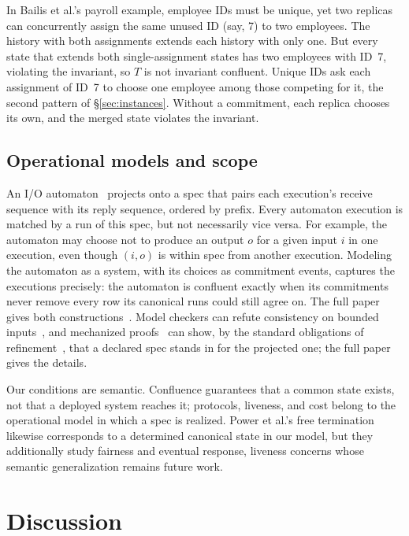 \documentclass[sigconf]{cidr-2027}
\theoremstyle{remark}
\newcommand{\commitment}{commitment\xspace}
\newcommand{\commitments}{commitments\xspace}
\newcommand{\inrel}{extends\xspace}          %
\newcommand{\outrel}{extends\xspace}          %
\newcommand{\extended}{the full paper~\cite{hellerstein2026completecalmfull}}
\begin{document}
In Bailis et al.'s payroll example, employee IDs must be unique, yet two
replicas can concurrently assign the same unused ID (say, 7) to two employees.
The history with both assignments \inrel each history with only one.  But every state that \outrel both single-assignment
states has two employees with ID~7, violating the invariant, so $T$ is not
invariant confluent.  Unique IDs ask each assignment of ID~7 to choose one
employee among those competing for it, the second pattern of
\S\ref{sec:instances}.  Without a \commitment, each replica chooses its own,
and the merged state violates the invariant.

\subsection{Operational models and scope}
\label{sec:scope}

An I/O automaton~\cite{lynch1987io} projects onto a spec that pairs each
execution's receive sequence with its reply sequence, ordered by prefix.
Every automaton execution is matched by a run of this spec, but not
necessarily vice versa.  For example, the automaton may choose not to produce
an output $o$ for a given input $i$ in one execution, even though $(i,o)$ is
within spec from another execution.  Modeling the automaton as a system, with
its choices as \commitment events, captures the executions precisely: the
automaton is confluent exactly when its \commitments never remove every row
its canonical runs could still agree on.  The full paper gives both
constructions~\cite{hellerstein2026completecalmfull}.
Model checkers can refute
consistency on bounded inputs~\cite{newcombe2015aws}, and mechanized
proofs~\cite{hawblitzel2015ironfleet} can show, by the standard obligations of
refinement~\cite{abadi1991refinement}, that a declared spec stands in for the
projected one; \extended{} gives the details.

  Our conditions are semantic.  Confluence guarantees that
a common state exists, not that a deployed system reaches it; protocols,
liveness, and cost belong to the operational model in which a spec
is realized.  Power et al.'s free termination~\cite{power2025freetermination}
likewise corresponds to a determined canonical state in our model, but they
additionally study fairness and eventual response, liveness concerns whose
semantic generalization remains future work.

\section{Discussion}
\label{sec:discussion}
\end{document}
